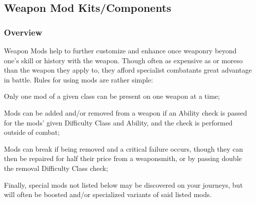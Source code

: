 \documentclass[12pt, twoside]{article}
\begin{document}
\begin{FlushLeft}
\begin{multicols}{2}
			\subsection{Weapon Mod Kits/Components}
			\subsubsection{Overview}
			Weapon Mods help to further customize and enhance once weaponry beyond one's skill or history with the weapon.
			Though often as expensive as or moreso than the weapon they apply to, they afford specialist combatants great advantage in battle. \linebreak
			Rules for using mods are rather simple: \linebreak

			Only one mod of a given class can be present on one weapon at a time; \linebreak

			Mods can be added and/or removed from a weapon if an Ability check is passed for the mods' given Difficulty Class and Ability, and the check is performed outside of combat; \linebreak

			Mods can break if being removed and a critical failure occurs, though they can then be repaired for half their price from a weaponsmith, or by passing double the removal Difficulty Class check; \linebreak

			Finally, special mods not listed below may be discovered on your journeys, but will often be boosted and/or specialized variants of said listed mods.


\end{multicols}
\end{FlushLeft}
\end{document}
